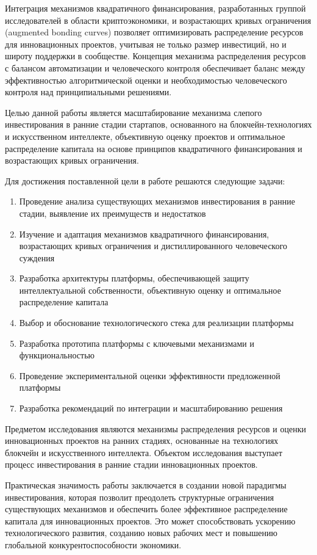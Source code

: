 \documentclass[
    14pt,
    specialist,
    candidate, %
    subf, %
    href,
    times,
    dotsinheaders=false,
    colorlinks=false
]{disser}
\begin{document}
Интеграция механизмов квадратичного финансирования, разработанных группой исследователей в области криптоэкономики, и возрастающих кривых ограничения (augmented bonding curves) позволяет оптимизировать распределение ресурсов для инновационных проектов, учитывая не только размер инвестиций, но и широту поддержки в сообществе. Концепция механизма распределения ресурсов с балансом автоматизации и человеческого контроля обеспечивает баланс между эффективностью алгоритмической оценки и необходимостью человеческого контроля над принципиальными решениями.

Целью данной работы является масштабирование механизма слепого инвестирования в ранние стадии стартапов, основанного на блокчейн-технологиях и искусственном интеллекте, объективную оценку проектов и оптимальное распределение капитала на основе принципов квадратичного финансирования и возрастающих кривых ограничения.

Для достижения поставленной цели в работе решаются следующие задачи:
\begin{enumerate}
  \item Проведение анализа существующих механизмов инвестирования в ранние стадии, выявление их преимуществ и недостатков
  \item Изучение и адаптация механизмов квадратичного финансирования, возрастающих кривых ограничения и дистиллированного человеческого суждения
  \item Разработка архитектуры платформы, обеспечивающей защиту интеллектуальной собственности, объективную оценку и оптимальное распределение капитала
  \item Выбор и обоснование технологического стека для реализации платформы
  \item Разработка прототипа платформы с ключевыми механизмами и функциональностью
  \item Проведение экспериментальной оценки эффективности предложенной платформы
  \item Разработка рекомендаций по интеграции и масштабированию решения
\end{enumerate}

Предметом исследования являются механизмы распределения ресурсов и оценки инновационных проектов на ранних стадиях, основанные на технологиях блокчейн и искусственного интеллекта. Объектом исследования выступает процесс инвестирования в ранние стадии инновационных проектов.

Практическая значимость работы заключается в создании новой парадигмы инвестирования, которая позволит преодолеть структурные ограничения существующих механизмов и обеспечить более эффективное распределение капитала для инновационных проектов. Это может способствовать ускорению технологического развития, созданию новых рабочих мест и повышению глобальной конкурентоспособности экономики.
\end{document}
